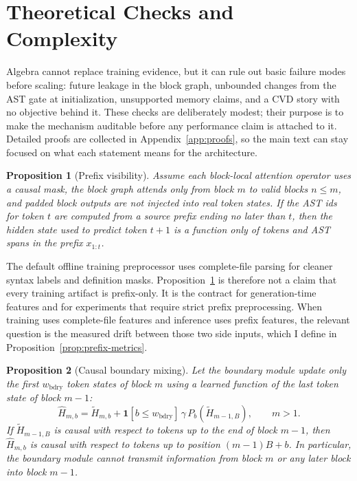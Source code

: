 \documentclass[10pt]{article}
\newtheorem{proposition}{Proposition}
\begin{document}
\section{Theoretical Checks and Complexity}
\label{sec:theory}

Algebra cannot replace training evidence, but it can rule out basic failure
modes before scaling: future leakage in the block graph, unbounded changes from
the AST gate at initialization, unsupported memory claims, and a CVD story with
no objective behind it.  These checks are deliberately modest; their purpose is
to make the mechanism auditable before any performance claim is attached to it.
Detailed proofs are collected in Appendix~\ref{app:proofs}, so the main text can
stay focused on what each statement means for the architecture.

\begin{proposition}[Prefix visibility]
\label{prop:prefix}
Assume each block-local attention operator uses a causal mask, the block graph
attends only from block $m$ to valid blocks $n\le m$, and padded block outputs
are not injected into real token states.  If the AST ids for token $t$ are
computed from a source prefix ending no later than $t$, then the hidden state
used to predict token $t+1$ is a function only of tokens and AST spans in the
prefix $x_{1:t}$.
\end{proposition}


The default offline training preprocessor uses complete-file parsing for
cleaner syntax labels and definition masks.  Proposition~\ref{prop:prefix} is
therefore not a claim that every training artifact is prefix-only.  It is the
contract for generation-time features and for experiments that require strict
prefix preprocessing.  When training uses complete-file features and inference
uses prefix features, the relevant question is the measured drift between those
two side inputs, which I define in Proposition~\ref{prop:prefix-metrics}.

\begin{proposition}[Causal boundary mixing]
\label{prop:boundary}
Let the boundary module update only the first $w_{\mathrm{bdry}}$ token states
of block $m$ using a learned function of the last token state of block $m-1$:
\[
  \hat H_{m,b}
  =
  \tilde H_{m,b}
  + \mathbf{1}[b\le w_{\mathrm{bdry}}]\,
    \gamma\,P_b(\tilde H_{m-1,B}),\qquad m>1 .
\]
If $\tilde H_{m-1,B}$ is causal with respect to tokens up to the end of block
$m-1$, then $\hat H_{m,b}$ is causal with respect to tokens up to position
$(m-1)B+b$.  In particular, the boundary module cannot transmit information
from block $m$ or any later block into block $m-1$.
\end{proposition}
\end{document}
